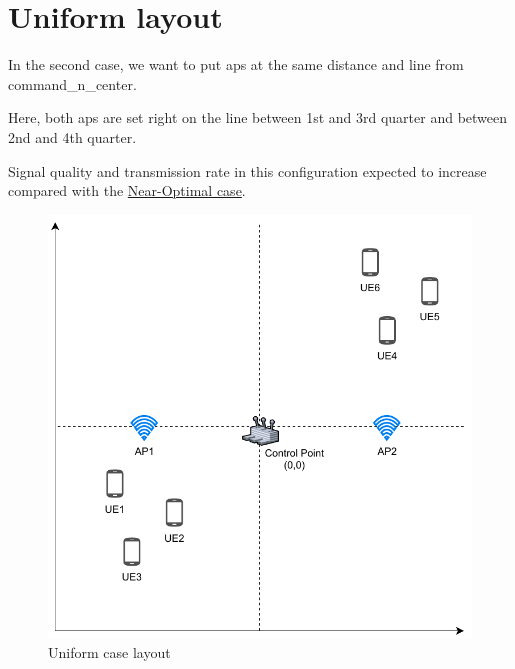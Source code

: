 \section{Uniform layout}\label{uniform-layout}

In the second case, we want to put \glspl{ap} at the same distance and line from \gls{command_n_center}.

Here, both \glspl{ap} are set right on the line between 1st and 3rd quarter and between 2nd and 4th quarter.

Signal quality and transmission rate in this configuration expected to increase compared with the \hyperref[near-optimal-layout]{Near-Optimal case}.

\begin{figure}[H]
	\centering
	\includegraphics[width=\linewidth,keepaspectratio]{images/05-cases-description-Uniform.pdf}
\caption{Uniform case layout}
\end{figure}
